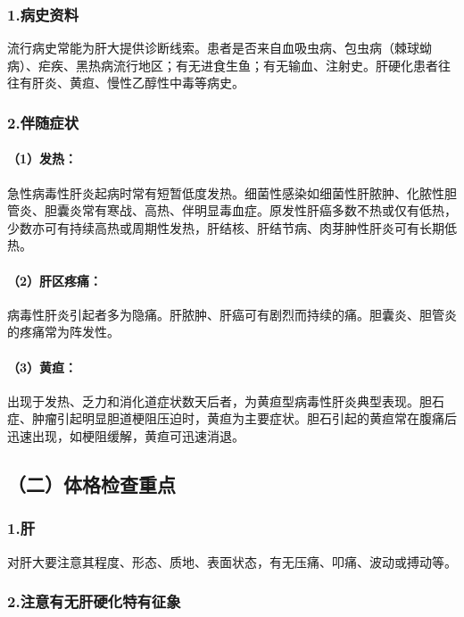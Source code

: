 \subsubsection{1.病史资料}

流行病史常能为肝大提供诊断线索。患者是否来自血吸虫病、包虫病（棘球蚴病）、疟疾、黑热病流行地区；有无进食生鱼；有无输血、注射史。肝硬化患者往往有肝炎、黄疸、慢性乙醇性中毒等病史。

\subsubsection{2.伴随症状}

\paragraph{（1）发热：}

急性病毒性肝炎起病时常有短暂低度发热。细菌性感染如细菌性肝脓肿、化脓性胆管炎、胆囊炎常有寒战、高热、伴明显毒血症。原发性肝癌多数不热或仅有低热，少数亦可有持续高热或周期性发热，肝结核、肝结节病、肉芽肿性肝炎可有长期低热。

\paragraph{（2）肝区疼痛：}

病毒性肝炎引起者多为隐痛。肝脓肿、肝癌可有剧烈而持续的痛。胆囊炎、胆管炎的疼痛常为阵发性。

\paragraph{（3）黄疸：}

出现于发热、乏力和消化道症状数天后者，为黄疸型病毒性肝炎典型表现。胆石症、肿瘤引起明显胆道梗阻压迫时，黄疸为主要症状。胆石引起的黄疸常在腹痛后迅速出现，如梗阻缓解，黄疸可迅速消退。

\subsection{（二）体格检查重点}

\subsubsection{1.肝}

对肝大要注意其程度、形态、质地、表面状态，有无压痛、叩痛、波动或搏动等。

\subsubsection{2.注意有无肝硬化特有征象}

